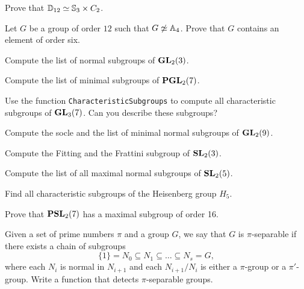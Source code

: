 \begin{prob}
  Prove that $\mathbb{D}_{12}\simeq\mathbb{S}_3\times C_2$.
\end{prob}

\begin{prob}
  Let $G$ be a group of order $12$ such that $G\not\simeq\mathbb{A}_4$. Prove that
  $G$ contains an element of order six.
\end{prob}

%

\begin{prob}
	\label{prob:minimal}
	Compute the list of normal subgroups of $\mathbf{GL}_2(3)$.
\end{prob}

\begin{prob}
	Compute the list of minimal subgroups of $\mathbf{PGL}_2(7)$.
\end{prob}

\begin{prob}
    Use the function \lstinline{CharacteristicSubgroups} to compute
    all characteristic subgroups of $\mathbf{GL}_3(7)$. Can you describe these subgroups?
\end{prob}

\begin{prob}
	\label{prob:socle}
	Compute the socle and the list of minimal normal subgroups of $\mathbf{GL}_2(9)$. 
\end{prob}

\begin{prob}
	\label{prob:fitting}
	Compute the Fitting and the Frattini subgroup of $\mathbf{SL}_2(3)$.
\end{prob}

\begin{prob}
	\label{prob:maximal}
	Compute the list of all maximal normal subgroups of $\mathbf{SL}_2(5)$. 
\end{prob}

\begin{prob}
    Find all characteristic subgroups
    of the Heisenberg group $H_5$. 
\end{prob}

\begin{prob}
	\label{prob:PSL2(7)_max}
	Prove that $\mathbf{PSL}_2(7)$ has a maximal subgroup of order 16.
\end{prob}

\begin{prob}
    Given  a set of prime numbers $\pi$ and a group $G$, we say that $G$ is $\pi$-separable 
    if there exists a chain of subgroups
    \[
    \{1\} = N_0 \subseteq N_1\subseteq \ldots\subseteq N_s = G,
    \]
    where each $N_i$ is normal in $N_{i+1}$ and each $N_{i+1}/N_i$ is either a $\pi$-group 
    or a $\pi'$-group. Write a function that detects $\pi$-separable groups.
\end{prob}

